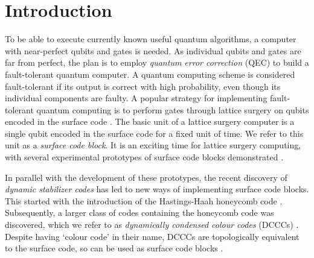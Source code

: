\section{Introduction}

To be able to execute currently known useful quantum algorithms, a computer with near-perfect qubits and gates is needed.
As individual qubits and gates are far from perfect,
the plan is to employ \emph{quantum error correction} (QEC) to build a fault-tolerant quantum computer.
A quantum computing scheme is considered fault-tolerant if its output is correct with high probability, even though its individual components are faulty.
A popular strategy for implementing fault-tolerant quantum computing is to perform gates through lattice surgery on qubits encoded in the surface code \cite{dennis2002topological,Horsman_2012_lattice_surgery,Litinski2019gameofsurfacecodes, gidney2021factor}.
The basic unit of a lattice surgery computer is a single qubit encoded in the surface code for a fixed unit of time. 
We refer to this unit as a  \textit{surface code block}.
It is an exciting time for lattice surgery computing, with several experimental prototypes of surface code blocks demonstrated 
\cite{acharya2024quantum, caune2024demonstrating, wootton2022measurements, eickbusch2024demonstrating, ali2024reducing, krinner2022realizing, harper2025characterising}.


In parallel with the development of these prototypes, the recent discovery of \textit{dynamic stabilizer codes} has led to new ways of implementing surface code blocks. This started with the introduction of the Hastings-Haah honeycomb code \cite{hastings2021dynamically}.
Subsequently, a larger class of codes containing the honeycomb code was discovered, which we refer to as \textit{dynamically condensed colour codes} (DCCCs) \cite{kesselring2022anyon}.
Despite having `colour code' in their name, DCCCs are topologically equivalent to the surface code, so can be used as surface code blocks
\cite{davydova2022floquet, bombin2024unifying, kesselring2022anyon}. 

